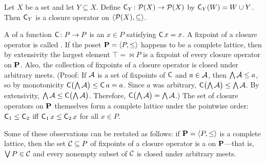 \begin{example}
Let $X$ be a set and let $Y \subseteq X$.
Define $\operatorname{\mathsf{C}}_Y\colon \mathcal{P}(X) \to \mathcal{P}(X)$ by $\operatorname{\mathsf{C}}_Y (W) = W \cup Y$.
Then $\operatorname{\mathsf{C}}_Y$ is a closure operator on $\langle\mathcal{P}(X), \subseteq\rangle$.
\end{example}


A  of a
function $\operatorname{\mathsf{C}} \colon  P \to P$ is an $x\in P$ satisfying $\operatorname{\mathsf{C}} x = x$.
A fixpoint of a closure operator is called .
If the poset $\mathbf{P} = \langle P, \leq\rangle$ happens to be a complete lattice,
then by extensivity the largest element $\top = \Join P$ is
a fixpoint of every closure operator on $\mathbf{P}$.
Also, the collection of fixpoints of a closure operator is closed under arbitrary meets.
(Proof: If $\mathcal{A}$ is a set of fixpoints of $\operatorname{\mathsf{C}}$ and  
$a \in \mathcal{A}$, then $\bigwedge \mathcal{A} \leq a$, so by monotonicity
$\operatorname{\mathsf{C}} \bigl( \bigwedge \mathcal{A} \bigr) \leq \operatorname{\mathsf{C}} a = a$. 
Since $a$ was arbitrary,
$\operatorname{\mathsf{C}} \bigl( \bigwedge \mathcal{A} \bigr) \leq  \bigwedge \mathcal{A}$.
By extensivity,
$\bigwedge \mathcal{A} \leq \operatorname{\mathsf{C}} \bigl( \bigwedge \mathcal{A}\bigr)$. %
Therefore, $\operatorname{\mathsf{C}} \bigl( \bigwedge \mathcal{A} \bigr) =  \bigwedge \mathcal{A}$.)
The set of closure operators on $\mathbf{P}$
themselves form a complete lattice under the pointwise
order: $\operatorname{\mathsf{C}}_1 \leq  \operatorname{\mathsf{C}}_2$ iff $\operatorname{\mathsf{C}}_1 x \leq  \operatorname{\mathsf{C}}_2 x$ for all $x \in P$. 

Some of these observations can be restated as follows:
if $\mathbf{P} = \langle P, \leq\rangle$ is a complete lattice,
then the set $\mathcal{C} \subseteq P$ of fixpoints of a closure operator
is a  on $\mathbf{P}$---that is, 
$\bigvee P \in \mathcal{C}$ and every nonempty subset of $\mathcal{C}$ is closed under arbitrary meets.


